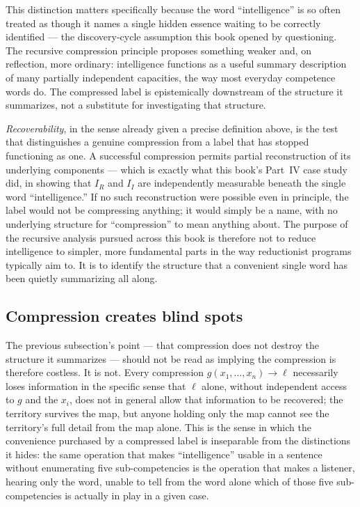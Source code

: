 This distinction matters specifically because the word ``intelligence'' is so often treated as though it names a single hidden essence waiting to be correctly identified --- the discovery-cycle assumption this book opened by questioning. The recursive compression principle proposes something weaker and, on reflection, more ordinary: intelligence functions as a useful summary description of many partially independent capacities, the way most everyday competence words do. The compressed label is epistemically downstream of the structure it summarizes, not a substitute for investigating that structure.

\emph{Recoverability}, in the sense already given a precise definition above, is the test that distinguishes a genuine compression from a label that has stopped functioning as one. A successful compression permits partial reconstruction of its underlying components --- which is exactly what this book's Part~IV case study did, in showing that $I_R$ and $I_I$ are independently measurable beneath the single word ``intelligence.'' If no such reconstruction were possible even in principle, the label would not be compressing anything; it would simply be a name, with no underlying structure for ``compression'' to mean anything about. The purpose of the recursive analysis pursued across this book is therefore not to reduce intelligence to simpler, more fundamental parts in the way reductionist programs typically aim to. It is to identify the structure that a convenient single word has been quietly summarizing all along.

\subsection*{Compression creates blind spots}

The previous subsection's point --- that compression does not destroy the structure it summarizes --- should not be read as implying the compression is therefore costless. It is not. Every compression $g(x_1,\ldots,x_n) \to \ell$ necessarily loses information in the specific sense that $\ell$ alone, without independent access to $g$ and the $x_i$, does not in general allow that information to be recovered; the territory survives the map, but anyone holding only the map cannot see the territory's full detail from the map alone. This is the sense in which the convenience purchased by a compressed label is inseparable from the distinctions it hides: the same operation that makes ``intelligence'' usable in a sentence without enumerating five sub-competencies is the operation that makes a listener, hearing only the word, unable to tell from the word alone which of those five sub-competencies is actually in play in a given case.

